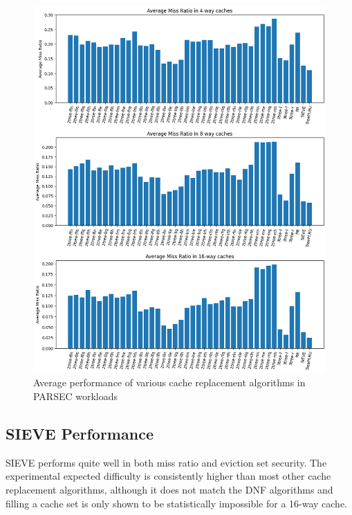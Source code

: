 \documentclass[letterpaper]{article}
\begin{document}
\begin{figure}
	\begin{center}
		\includegraphics[scale=0.45]{performance}
	\end{center}
  \caption{Average performance of various cache replacement algorithms in PARSEC workloads}
  \label{fig:performance}
\end{figure}

\subsection{SIEVE Performance}


SIEVE performs quite well in both miss ratio and eviction set security.
The experimental expected difficulty is consistently higher than most other cache replacement algorithms,
although it does not match the DNF algorithms and filling a cache set
is only shown to be statistically impossible for a 16-way cache.
\end{document}
